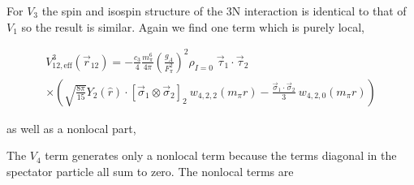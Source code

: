 \documentclass[%
 preprint,
 amsmath,amssymb,
 aps,
]{revtex4-1}
\newcommand{\rhohat}[2]{\hat{\rho}_{\text{I}=#1}\left( #2 \right)}
\newcommand{\rot}{\vec{r}_{12}}
\newcommand{\rotp}{\vec{r}_{12}\!\!\!'\,\,}
\newcommand{\taudot}{\vec{\tau}_1\cdot\vec{\tau}_2}
\newcommand{\sigmadot}{\vec{\sigma}_1\cdot\vec{\sigma}_2}
\newcommand{\sigmatwo}{[\vec{\sigma}_1\otimes\vec{\sigma}_2]_2}
\newcommand{\w}[4]{w_{#1,#2,#3}(#4)}
\begin{document}
% 

For $V_3$ the spin and isospin structure of the 3N interaction is identical to that of $V_1$ so the result is similar. Again we find one term which is purely local,

\begin{multline}
V^{3}_{12,\text{eff}}(\rot)=-\frac{c_3 }{4}\frac{m_\pi^6}{4\pi}\left(\frac{g_A}{F_\pi^2}\right)^2 \rho_{I=0}\;\taudot\:\\
 \times\left(\sqrt{\frac{8\pi}{15}}Y_2(\hat{r})\cdot\sigmatwo\: \w{4}{2}{2}{m_\pi r} - \frac{\sigmadot}{3}\:  \w{4}{2}{0}{m_\pi r} \right)
\end{multline}

as well as a nonlocal part,

The $V_4$ term generates only a nonlocal term because the terms diagonal in the spectator particle all sum to zero. The nonlocal terms are
\end{document}

